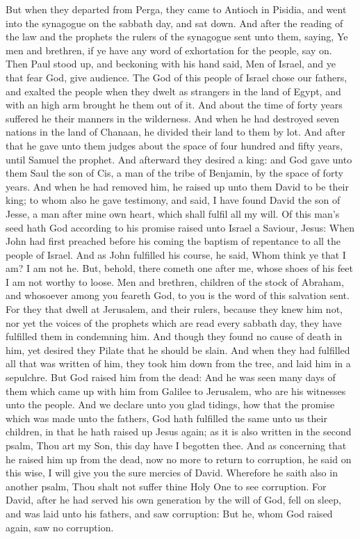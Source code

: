  But when they departed from Perga, they came to Antioch
in Pisidia, and went into the synagogue on the sabbath day, and sat
down.  And after the reading of the law and the prophets
the rulers of the synagogue sent unto them, saying, Ye men and brethren,
if ye have any word of exhortation for the people, say on. 
Then Paul stood up, and beckoning with his hand said, Men of Israel, and
ye that fear God, give audience.  The God of this people of
Israel chose our fathers, and exalted the people when they dwelt as
strangers in the land of Egypt, and with an high arm brought he them out
of it.  And about the time of forty years suffered he their
manners in the wilderness.  And when he had destroyed seven
nations in the land of Chanaan, he divided their land to them by lot.
 And after that he gave unto them judges about the space of
four hundred and fifty years, until Samuel the prophet. 
And afterward they desired a king: and God gave unto them Saul the son
of Cis, a man of the tribe of Benjamin, by the space of forty years.
 And when he had removed him, he raised up unto them David
to be their king; to whom also he gave testimony, and said, I have found
David the son of Jesse, a man after mine own heart, which shall fulfil
all my will.  Of this man's seed hath God according to his
promise raised unto Israel a Saviour, Jesus:  When John had
first preached before his coming the baptism of repentance to all the
people of Israel.  And as John fulfilled his course, he
said, Whom think ye that I am? I am not he. But, behold, there cometh
one after me, whose shoes of his feet I am not worthy to loose.
 Men and brethren, children of the stock of Abraham, and
whosoever among you feareth God, to you is the word of this salvation
sent.  For they that dwell at Jerusalem, and their rulers,
because they knew him not, nor yet the voices of the prophets which are
read every sabbath day, they have fulfilled them in condemning him.
 And though they found no cause of death in him, yet
desired they Pilate that he should be slain.  And when they
had fulfilled all that was written of him, they took him down from the
tree, and laid him in a sepulchre.  But God raised him from
the dead:  And he was seen many days of them which came up
with him from Galilee to Jerusalem, who are his witnesses unto the
people.  And we declare unto you glad tidings, how that the
promise which was made unto the fathers,  God hath
fulfilled the same unto us their children, in that he hath raised up
Jesus again; as it is also written in the second psalm, Thou art my Son,
this day have I begotten thee.  And as concerning that he
raised him up from the dead, now no more to return to corruption, he
said on this wise, I will give you the sure mercies of David.
 Wherefore he saith also in another psalm, Thou shalt not
suffer thine Holy One to see corruption.  For David, after
he had served his own generation by the will of God, fell on sleep, and
was laid unto his fathers, and saw corruption:  But he,
whom God raised again, saw no corruption.

